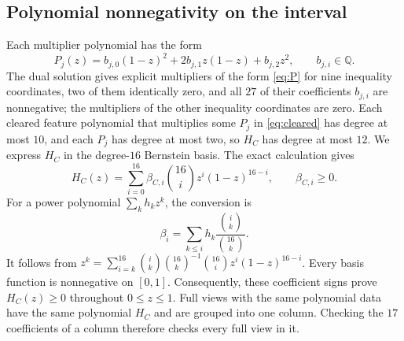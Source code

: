 \documentclass[11pt]{article}
\begin{document}
\subsection{Polynomial nonnegativity on the interval}
Each multiplier polynomial has the form
\begin{equation}\label{eq:P}
 P_j(z)=b_{j,0}(1-z)^2+2b_{j,1}z(1-z)+b_{j,2}z^2,
 \qquad b_{j,i}\in\mathbb Q.
\end{equation}
The dual solution gives explicit multipliers of the form \eqref{eq:P} for nine inequality coordinates, two of them identically zero, and all $27$ of their coefficients $b_{j,i}$ are nonnegative; the multipliers of the other inequality coordinates are zero. Each cleared feature polynomial that multiplies some $P_j$ in \eqref{eq:cleared} has degree at most $10$, and each $P_j$ has degree at most two, so $H_C$ has degree at most $12$. We express $H_C$ in the degree-$16$ Bernstein basis. The exact calculation gives
\begin{equation}\label{eq:bern}
 H_C(z)=\sum_{i=0}^{16}\beta_{C,i}\binom{16}{i}z^i(1-z)^{16-i},
 \qquad \beta_{C,i}\ge0.
\end{equation}
For a power polynomial $\sum_k h_kz^k$, the conversion is
\[
 \beta_i=\sum_{k\le i}h_k\frac{\binom{i}{k}}{\binom{16}{k}}.
\]
It follows from $z^k=\sum_{i=k}^{16}\binom{i}{k}\binom{16}{k}^{-1}
\binom{16}{i}z^i(1-z)^{16-i}$. Every basis function is nonnegative on $[0,1]$. Consequently, these coefficient signs prove $H_C(z)\ge0$ throughout $0\le z\le1$. Full views with the same polynomial data have the same polynomial $H_C$ and are grouped into one column. Checking the $17$ coefficients of a column therefore checks every full view in it.
\end{document}
